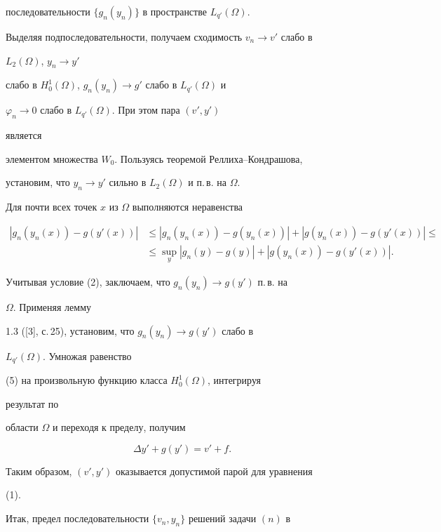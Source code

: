 \begin{pf}
последовательности $\{g_n(y_n)\}$ в пространстве $L_{q'}(\Omega)$. 


 


Выделяя подпоследовательности, получаем сходимость $v_n\to v'$ слабо в 


$L_2(\Omega)$, $y_n\to y'$ 


слабо в $H^1_0(\Omega)$, $g_n(y_n)\to g'$ слабо в $L_{q'}(\Omega)$ и 


$\varphi_n\to0$ слабо в $L_{q'}(\Omega)$. При этом пара $(v',y')$ 


является 


элементом множества $W_0$. Пользуясь теоремой Реллиха--Кондрашова, 


установим, что $y_n\to y'$ сильно в $L_2(\Omega)$ и п.\,в. на $\Omega$. 


Для почти всех точек $x$ из $\Omega$ выполняются неравенства 


\begin{align*} 


|g_n(y_n(x))-g(y'(x))|&\le |g_n(y_n(x))-g(y_n(x))|+ 


|g(y_n(x))-g(y'(x))|\le \\ 


% 


&\le\sup_y|g_n(y)-g(y)|+|g(y_n(x))-g(y'(x))|. 


\end{align*} 


Учитывая условие (2), заключаем, что $g_n(y_n)\to g(y')$ п.\,в. на 


$\Omega$. Применяя лемму 


1.3 ([3], с.\,25), установим, что $g_n(y_n)\to g(y')$ слабо в 


$L_{q'}(\Omega)$. Умножая равенство 


(5) на произвольную функцию класса $H^1_0(\Omega)$, интегрируя 


результат по 


области $\Omega$ и переходя к пределу, получим 


$$ 


\Delta y'+g(y')=v'+f. 


$$ 


Таким образом, $(v',y')$ оказывается допустимой парой для уравнения 


(1). 


 


Итак, предел последовательности $\{v_n,y_n\}$ решений задачи $(n)$ в 



\end{pf}
